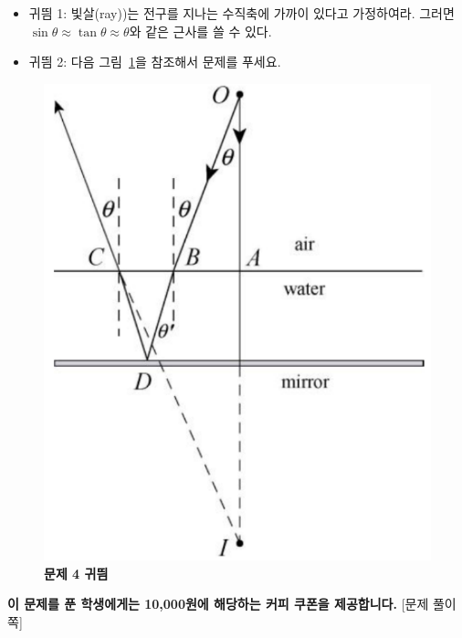 \documentclass[tightenlines,floatfix,nofootinbib,superscriptaddress,fleqn]{revtex4}
\begin{document}
\begin{itemize}
\item \noindent 귀띔 1: 빛살(ray))는 전구를 지나는 수직축에 가까이 있다고
가정하여라. 그러면 $\sin\theta\approx \tan\theta \approx \theta$와
같은 근사를 쓸 수 있다.
\item \noindent 귀띔 2: 다음 그림~\ref{fig:3}을 참조해서 문제를 푸세요.
\end{itemize}
\begin{figure}[htp]
  \centering
  \includegraphics[scale=0.5]{qfig13-4-1-20221031.pdf} 
  \caption{\textbf{문제 4 귀띔}}
  \label{fig:3}
\end{figure}

\vspace{0.3cm}

\noindent \textbf{\color{blue} 이 문제를 푼 학생에게는 10,000원에
  해당하는 커피 쿠폰을 제공합니다.}  
\newpage
{\color{gray} [문제 풀이 쪽]}
\end{document}
